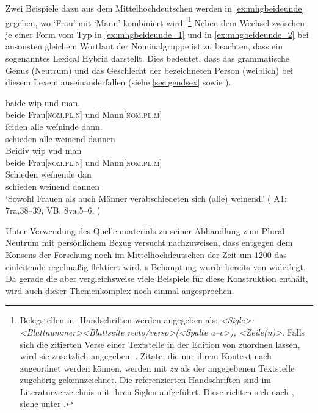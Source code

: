 Zwei Beispiele dazu aus dem Mittelhochdeutschen werden in
\cref{ex:mhgbeideunde} gegeben, wo  `Frau' mit 
`Mann' kombiniert wird.%
%
	\footnote{Belegstellen in \KC{}-Handschriften werden angegeben als:
		\textit{<Sigle>: <Blattnummer><Blattseite recto/verso>(<Spalte a--c>),%
		<Zeile(n)>}. Falls sich die zitierten Verse einer Textstelle in der
		Edition von \citet{schroeder1895} zuordnen lassen, wird sie zusätzlich
		angegeben: \textit{\cite[vgl. (abweichend)][<Seite>
		{[=~V.~<Vers>]}]{schroeder1895}}. Zitate, die nur ihrem Kontext nach
		zugeordnet werden können, werden mit \textit{zu} als der angegebenen
		Textstelle zugehörig gekennzeichnet. Die referenzierten Handschriften
		sind im Literaturverzeichnis mit ihren Siglen aufgeführt. Diese richten
		sich nach , siehe unter
		\nocite{kcdigital}.%
	}
%
Neben dem Wechsel zwischen je einer Form vom Typ  in
\cref{ex:mhgbeideunde_1} und  in \cref{ex:mhgbeideunde_2} bei
ansonsten gleichem Wortlaut der Nominalgruppe ist zu beachten, dass 
ein sogenanntes Lexical Hybrid darstellt. Dies bedeutet, dass das grammatische
Genus (Neutrum) und das Geschlecht der bezeichneten Person (weiblich) bei
diesem Lexem auseinanderfallen (siehe \cref{sec:gendsex} sowie
\cite[183--184]{corbett1991}).

\begin{exe}
\ex \label{ex:mhgbeideunde}
	\begin{xlist}
	\ex \label{ex:mhgbeideunde_1}
		\gll baide wip und man. \\
			beide Frau[\textsc{nom.pl.n}] und Mann[\textsc{nom.pl.m}] \\
	\sn \gll ſciden alle weíninde dann. \\
			schieden alle weinend dannen \\

	\ex \label{ex:mhgbeideunde_2}
		\gll Beidiv wip vnd man \\
			beide Frau[\textsc{nom.pl.n}] und Mann[\textsc{nom.pl.m}] \\
	\sn \gll Schieden weínende dan \\
			schieden weinend dannen \\
		\trans `Sowohl Frauen als auch Männer verabschiedeten sich (alle)
			weinend.'
			(%
				A1: 7ra,38--39;
				VB: 8va,5--6;
				\cite[vgl.][110 {[=~V.~1564--1565]}]{schroeder1895}%
			)
	\end{xlist}
\end{exe}

Unter Verwendung des Quellenmaterials zu seiner Abhandlung zum Plural Neutrum
mit persönlichem Bezug \autocite{askedal1973} versucht \citet{askedal1974}
nachzuweisen, dass entgegen dem Konsens der Forschung
\autocites[vgl.~z.\,B.][433]{behaghel1923}[133]{dal2014}[626]{ksw2} noch im
Mittelhochdeutschen der Zeit um 1200 das einleitende  regelmäßig
flektiert wird. \citeauthor{askedal1974}s Behauptung wurde bereits von
\citet{gjelsten1980} widerlegt. Da gerade die \KC{} aber vergleichsweise
viele Beispiele für diese Konstruktion enthält, wird auch dieser Themenkomplex
noch einmal angesprochen.

